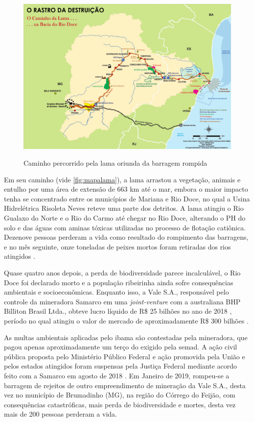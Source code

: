 \documentclass[
article,			%
11pt,				%
oneside,			%
a4paper,			%
english,			%
brazil,				%
sumario=tradicional
]{abntex2}
\begin{document}
	\begin{figure}[htb]
		\centering
		\caption{Caminho percorrido pela lama oriunda da barragem rompida}
		\includegraphics[width=1.0\linewidth]{img/pinto_005_01.png}
		\label{fig:mapalama}
	\end{figure}
	 
	Em seu caminho (vide \autoref{fig:mapalama}), a lama arrastou a vegetação, animais e entulho por uma área de extensão de 663 km até o mar, embora o maior impacto tenha se concentrado entre os municípios de Mariana e Rio Doce, no qual a Usina Hidrelétrica Risoleta Neves reteve uma parte dos detritos. A lama atingiu o Rio Gualaxo do Norte e o Rio do Carmo até chegar no Rio Doce, alterando o PH do solo e das águas com aminas tóxicas utilizadas no processo de flotação catiônica. Dezenove pessoas perderam a vida como resultado do rompimento das barragens, e no mês seguinte, onze toneladas de peixes mortos foram retiradas dos rios atingidos \cite{lopes2016a}.
	 
	Quase quatro anos depois, a perda de biodiversidade parece incalculável, o Rio Doce foi declarado morto e a população ribeirinha ainda sofre consequências ambientais e socioeconômicas. Enquanto isso, a Vale S.A., responsável pelo controle da mineradora Samarco em uma \textit{joint-venture} com a australiana BHP Billiton Brasil Ltda., obteve lucro líquido de R\$ 25 bilhões no ano de 2018 \cite{glauce2019a} \cite{sudre2019a}, período no qual atingiu o valor de mercado de aproximadamente R\$ 300 bilhões \cite{sudre2019a}.
	 
	As multas ambientais aplicadas pelo \gls{ibama} são contestadas pela mineradora, que pagou apenas aproximadamente um terço  do exigido pela \glsdesc{semad}. A ação civil pública proposta pelo Ministério Público Federal e ação promovida pela União e pelos estados atingidos foram suspensas pela Justiça Federal mediante acordo feito com a Samarco em agosto de 2018 \cite{rodrigues2019a}. Em Janeiro de 2019, rompeu-se  a barragem de rejeitos de outro empreendimento de mineração da Vale S.A., desta vez no município de Brumadinho (MG), na região do Córrego do Feijão, com consequências catastróficas, mais perda de biodiversidade e mortes, desta vez mais de 200 pessoas perderam a vida.
	 
\end{document}
